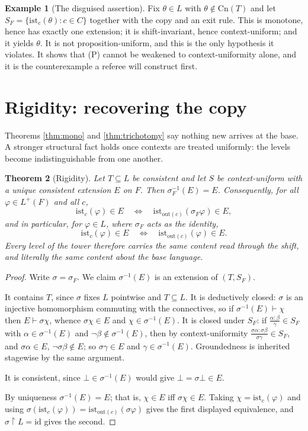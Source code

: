 \documentclass[11pt]{article}
\theoremstyle{plain}
\newtheorem{theorem}{Theorem}
\theoremstyle{definition}
\newtheorem{example}[theorem]{Example}
\theoremstyle{remark}
\newcommand{\ist}{\mathrm{ist}}
\newcommand{\Cn}{\mathrm{Cn}}
\newcommand{\out}{\mathrm{out}}
\newcommand{\Lp}{L^{+}}
\begin{document}
\begin{example}[The disguised assertion]\label{ex:theta}
Fix $\theta \in L$ with $\theta \notin \Cn(T)$ and let
$S_F = \{\ist_c(\theta) : c \in C\}$ together with the copy and an exit rule.
This is monotone, hence has exactly one extension; it is shift-invariant, hence
context-uniform; and it yields $\theta$. It is not proposition-uniform, and this
is the only hypothesis it violates. It shows that (P) cannot be weakened to
context-uniformity alone, and it is the counterexample a referee will construct
first.
\end{example}

\section{Rigidity: recovering the copy}

Theorems \ref{thm:mono} and \ref{thm:trichotomy} say nothing new arrives at the
base. A stronger structural fact holds once contexts are treated uniformly: the
levels become indistinguishable from one another.

\begin{theorem}[Rigidity]\label{thm:rigidity}
Let $T \subseteq L$ be consistent and let $S$ be context-uniform with a unique
consistent extension $E$ on $F$. Then $\sigma_F^{-1}(E) = E$. Consequently, for
all $\varphi \in \Lp(F)$ and all $c$,
\[
\ist_c(\varphi) \in E \quad\Longleftrightarrow\quad
\ist_{\out(c)}(\sigma_F\varphi) \in E ,
\]
and in particular, for $\varphi \in L$, where $\sigma_F$ acts as the identity,
\[
\ist_c(\varphi) \in E \quad\Longleftrightarrow\quad
\ist_{\out(c)}(\varphi) \in E .
\]
Every level of the tower therefore carries the same content read through the
shift, and literally the same content about the base language.
\end{theorem}

\begin{proof}
Write $\sigma=\sigma_F$. We claim $\sigma^{-1}(E)$ is an extension of
$(T,S_F)$.

It contains $T$, since $\sigma$ fixes $L$ pointwise and $T\subseteq L$. It is
deductively closed: $\sigma$ is an injective homomorphism commuting with the
connectives, so if $\sigma^{-1}(E) \vdash \chi$ then $E \vdash \sigma\chi$,
whence $\sigma\chi \in E$ and $\chi \in \sigma^{-1}(E)$. It is closed under
$S_F$: if $\frac{\alpha:\beta}{\gamma} \in S_F$ with
$\alpha \in \sigma^{-1}(E)$ and $\neg\beta \notin \sigma^{-1}(E)$, then by
context-uniformity $\frac{\sigma\alpha:\sigma\beta}{\sigma\gamma} \in S_F$, and
$\sigma\alpha \in E$, $\neg\sigma\beta \notin E$; so $\sigma\gamma \in E$ and
$\gamma \in \sigma^{-1}(E)$. Groundedness is inherited stagewise by the same
argument.

It is consistent, since $\bot \in \sigma^{-1}(E)$ would give
$\bot = \sigma\bot \in E$.

By uniqueness $\sigma^{-1}(E) = E$; that is, $\chi \in E$ iff $\sigma\chi \in E$.
Taking $\chi = \ist_c(\varphi)$ and using
$\sigma(\ist_c(\varphi)) = \ist_{\out(c)}(\sigma\varphi)$ gives the first
displayed equivalence, and $\sigma\!\restriction\! L = \mathrm{id}$ gives the
second.
\end{proof}
\end{document}
